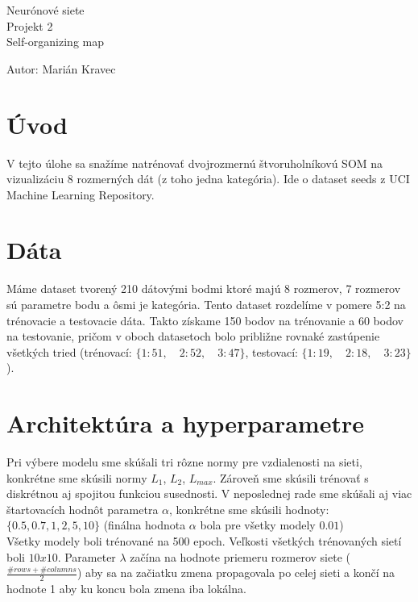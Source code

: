 \documentclass[a4paper]{article}
\begin{document}
 
	
	\pagestyle{plain}
	
	\begin{center}
		\sc\large
		Neurónové siete\\
		Projekt 2\\
		Self-organizing map
	\end{center}
	
	Autor: Marián Kravec
	\\
	
	\section{Úvod}
	
	V tejto úlohe sa snažíme natrénovať dvojrozmernú štvoruholníkovú SOM na vizualizáciu 8 rozmerných dát (z toho jedna kategória). Ide o dataset seeds z UCI Machine Learning Repository.
	
	\section{Dáta}
	
	Máme dataset tvorený 210 dátovými bodmi ktoré majú 8 rozmerov, 7 rozmerov sú parametre bodu a ôsmi je kategória. Tento dataset rozdelíme v pomere 5:2 na trénovacie a testovacie dáta. Takto získame 150 bodov na trénovanie a 60 bodov na testovanie, pričom v oboch datasetoch bolo približne rovnaké zastúpenie všetkých tried (trénovací: $\{1: 51,\quad 2: 52,\quad 3: 47\}$, testovací: $\{1: 19,\quad 2: 18,\quad 3: 23\}$).
	
	\section{Architektúra a hyperparametre}
	
	Pri výbere modelu sme skúšali tri rôzne normy pre vzdialenosti na sieti, konkrétne sme skúsili normy $L_1$, $L_2$, $L_{max}$. Zároveň sme skúsili trénovať s diskrétnou aj spojitou funkciou susednosti. V neposlednej rade sme skúšali aj viac štartovacích hodnôt parametra $\alpha$, konkrétne sme skúsili hodnoty: $\{0.5, 0.7, 1, 2, 5, 10\}$ (finálna hodnota $\alpha$ bola pre všetky modely $0.01$)
	\\
	
	Všetky modely boli trénované na 500 epoch. Veľkosti všetkých trénovaných sietí boli $10x10$. Parameter $\lambda$ začína na hodnote priemeru rozmerov siete ($\frac{\#rows + \#columns}{2}$) aby sa na začiatku zmena propagovala po celej sieti a končí na hodnote 1 aby ku koncu bola zmena iba lokálna. 
	\\
	
\end{document}
